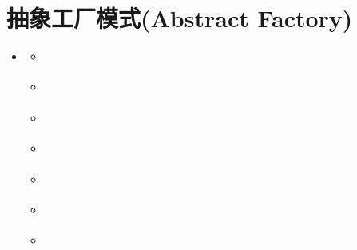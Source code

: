 \documentclass[letterpaper,10pt,english]{sphinxmanual}
\begin{document}
\section{抽象工厂模式(Abstract Factory)}
\label{\detokenize{creational_patterns/abstract_factory:abstract-factory}}\label{\detokenize{creational_patterns/abstract_factory::doc}}
\begin{sphinxShadowBox}
\begin{itemize}
\item {} 
\sphinxAtStartPar
{}\label{\detokenize{creational_patterns/abstract_factory:id17}}{\hyperref[\detokenize{creational_patterns/abstract_factory:abstract-factory}]{}}
\begin{itemize}
\item {} 
\sphinxAtStartPar
{}\label{\detokenize{creational_patterns/abstract_factory:id18}}{\hyperref[\detokenize{creational_patterns/abstract_factory:id2}]{}}

\item {} 
\sphinxAtStartPar
{}\label{\detokenize{creational_patterns/abstract_factory:id19}}{\hyperref[\detokenize{creational_patterns/abstract_factory:id3}]{}}

\item {} 
\sphinxAtStartPar
{}\label{\detokenize{creational_patterns/abstract_factory:id20}}{\hyperref[\detokenize{creational_patterns/abstract_factory:id4}]{}}

\item {} 
\sphinxAtStartPar
{}\label{\detokenize{creational_patterns/abstract_factory:id21}}{\hyperref[\detokenize{creational_patterns/abstract_factory:id5}]{}}

\item {} 
\sphinxAtStartPar
{}\label{\detokenize{creational_patterns/abstract_factory:id22}}{\hyperref[\detokenize{creational_patterns/abstract_factory:id6}]{}}

\item {} 
\sphinxAtStartPar
{}\label{\detokenize{creational_patterns/abstract_factory:id23}}{\hyperref[\detokenize{creational_patterns/abstract_factory:id7}]{}}

\item {} 
\sphinxAtStartPar
{}\label{\detokenize{creational_patterns/abstract_factory:id24}}{\hyperref[\detokenize{creational_patterns/abstract_factory:id8}]{}}


\end{itemize}
\end{itemize}
\end{sphinxShadowBox}
\end{document}
